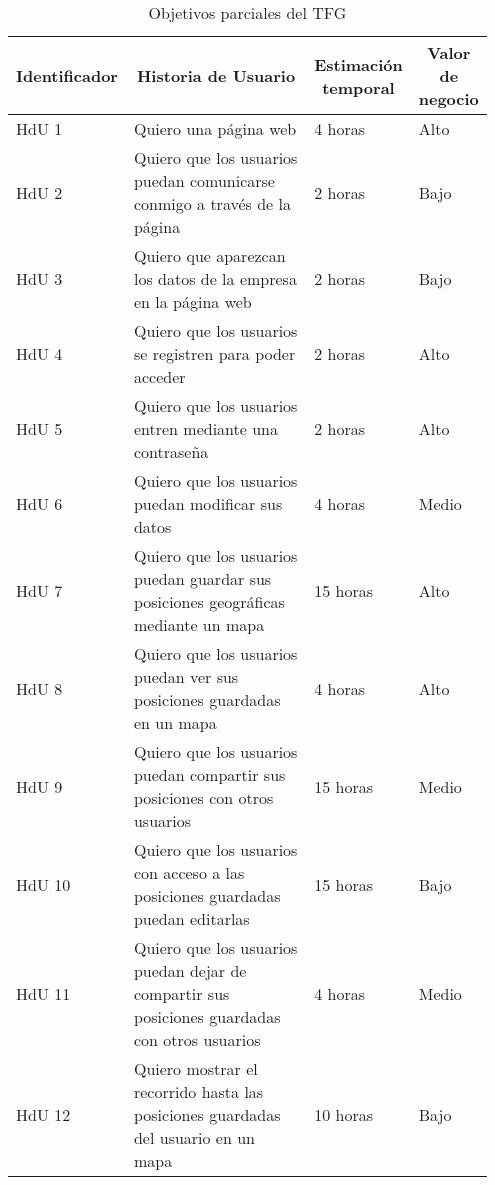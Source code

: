 	\begin{table}[hp]
	  \centering 
	  \begin{tabular}{p{0.15\linewidth}p{0.5\linewidth}p{0.15\linewidth}p{0.15\linewidth}}
	    \multicolumn{1}{l}{\cellcolor{black!30}\textbf{Identificador}} & 
	 	\multicolumn{1}{c}{\cellcolor{black!30}\textbf{Historia de Usuario}} &
 	 	\multicolumn{1}{c}{\cellcolor{black!30}\textbf{Estimación temporal}} &
 	 	\multicolumn{1}{c}{\cellcolor{black!30}\textbf{Valor de negocio}} 
	 	\\
	    \toprule
		HdU 1	&	Quiero una página web																				&	4 horas	&	Alto	\\
		HdU 2	&	Quiero que los usuarios puedan comunicarse conmigo a través de la página							&	2 horas	&	Bajo	\\
		HdU 3	&	Quiero que aparezcan los datos de la empresa en la página web										&	2 horas	&	Bajo	\\
		HdU 4	&	Quiero que los usuarios se registren para poder acceder 											&	2 horas	&	Alto	\\
		HdU 5	&	Quiero que los usuarios entren mediante una contraseña												&	2 horas	&	Alto	\\
		HdU 6	&	Quiero que los usuarios puedan modificar sus datos													&	4 horas	&	Medio	\\
		HdU 7	& 	Quiero que los usuarios puedan guardar sus posiciones geográficas	mediante un mapa				&	15 horas&	Alto	\\
		HdU 8	&	Quiero que los usuarios puedan ver sus posiciones guardadas en un mapa							&	4 horas	&	Alto	\\
		HdU 9	&	Quiero que los usuarios puedan compartir sus posiciones con otros usuarios						&	15 horas&	Medio	\\
		HdU 10	&	Quiero que los usuarios con acceso a las posiciones guardadas puedan editarlas					&	15 horas&	Bajo	\\
		HdU 11	&	Quiero que los usuarios puedan dejar de compartir sus posiciones guardadas con otros usuarios		&	4 horas	&	Medio	\\
		HdU 12	&	Quiero mostrar el recorrido hasta las posiciones guardadas del usuario en un mapa					&	10 horas&	Bajo	\\
		
		
	    \hline
	  \end{tabular}
	  \caption{Objetivos parciales del \ac{TFG}}
	  \label{tab:historia_usuario}
	\end{table}
	
